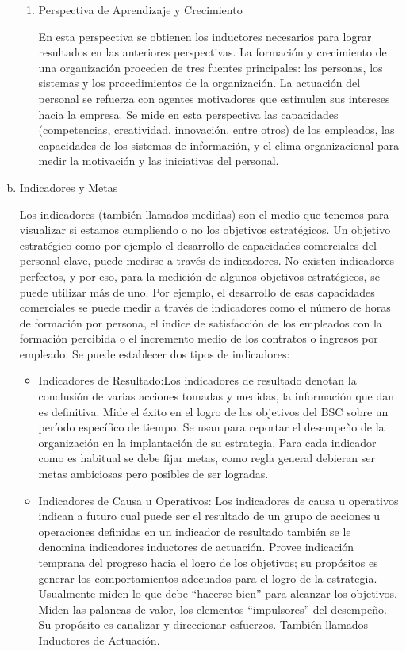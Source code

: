 \begin{enumerate}[a)]
\begin{enumerate}[1.]
		\item Perspectiva de Aprendizaje y Crecimiento

		En esta perspectiva se obtienen los inductores necesarios para lograr resultados en las anteriores perspectivas. La formación y crecimiento de una organización proceden de tres fuentes principales: las personas, los sistemas y los procedimientos de la organización.
La actuación del personal se refuerza con agentes motivadores que estimulen sus intereses hacia la empresa. Se mide en esta perspectiva las capacidades (competencias, creatividad, innovación, entre otros) de los empleados, las capacidades de los sistemas de información, y el clima organizacional para medir la motivación y las iniciativas del personal.


		\end{enumerate}

	 \item Indicadores y Metas

	Los indicadores (también llamados medidas) son el medio que tenemos para visualizar si estamos cumpliendo o no los objetivos estratégicos.
Un objetivo estratégico como por ejemplo el desarrollo de capacidades comerciales del personal clave, puede medirse a través de indicadores. No existen indicadores perfectos, y por eso, para la medición de algunos objetivos estratégicos, se puede utilizar más de uno. Por ejemplo, el desarrollo de esas capacidades comerciales se puede medir a través de indicadores como el número de horas de formación por persona, el índice de satisfacción de los empleados con la formación percibida o el incremento medio de los contratos o ingresos por empleado. Se puede establecer dos tipos de indicadores:

		\begin{itemize}
  		  \item Indicadores de Resultado:Los indicadores de resultado denotan la conclusión de varias acciones tomadas y medidas, la información que dan es definitiva. Mide el éxito en el logro de los objetivos del BSC sobre un período específico de tiempo. Se usan para reportar el desempeño de la organización en la implantación de su estrategia. Para cada indicador como es habitual se debe fijar metas, como regla general debieran ser metas ambiciosas pero posibles de ser logradas.

  		  \item Indicadores de Causa u Operativos: Los indicadores de causa u operativos indican a futuro cual puede ser el resultado de un grupo de acciones u operaciones definidas en un indicador de resultado también se le denomina indicadores inductores de actuación. Provee indicación temprana del progreso hacia el logro de los objetivos; su propósitos es generar los comportamientos adecuados para el logro de la estrategia. Usualmente miden lo que debe “hacerse bien” para alcanzar los objetivos. Miden las palancas de valor, los elementos “impulsores” del desempeño. Su propósito es canalizar y direccionar esfuerzos. También llamados Inductores de Actuación.
  		 

\end{itemize}
\end{enumerate}
